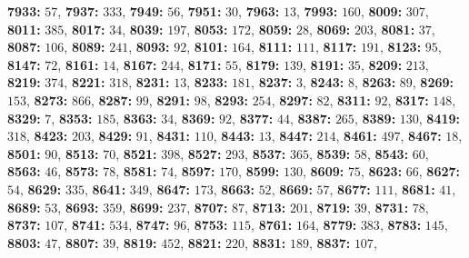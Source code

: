 \textsf{\bfseries 7933:} $57$, \textsf{\bfseries 7937:} $333$, \textsf{\bfseries 7949:} $56$, \textsf{\bfseries 7951:} $30$, \textsf{\bfseries 7963:} $13$, \textsf{\bfseries 7993:} $160$, \textsf{\bfseries 8009:} $307$, \textsf{\bfseries 8011:} $385$, \textsf{\bfseries 8017:} $34$, \textsf{\bfseries 8039:} $197$, \textsf{\bfseries 8053:} $172$, \textsf{\bfseries 8059:} $28$, \textsf{\bfseries 8069:} $203$, \textsf{\bfseries 8081:} $37$, \textsf{\bfseries 8087:} $106$, \textsf{\bfseries 8089:} $241$, \textsf{\bfseries 8093:} $92$, \textsf{\bfseries 8101:} $164$, \textsf{\bfseries 8111:} $111$, \textsf{\bfseries 8117:} $191$, \textsf{\bfseries 8123:} $95$, \textsf{\bfseries 8147:} $72$, \textsf{\bfseries 8161:} $14$, \textsf{\bfseries 8167:} $244$, \textsf{\bfseries 8171:} $55$, \textsf{\bfseries 8179:} $139$, \textsf{\bfseries 8191:} $35$, \textsf{\bfseries 8209:} $213$, \textsf{\bfseries 8219:} $374$, \textsf{\bfseries 8221:} $318$, \textsf{\bfseries 8231:} $13$, \textsf{\bfseries 8233:} $181$, \textsf{\bfseries 8237:} $3$, \textsf{\bfseries 8243:} $8$, \textsf{\bfseries 8263:} $89$, \textsf{\bfseries 8269:} $153$, \textsf{\bfseries 8273:} $866$, \textsf{\bfseries 8287:} $99$, \textsf{\bfseries 8291:} $98$, \textsf{\bfseries 8293:} $254$, \textsf{\bfseries 8297:} $82$, \textsf{\bfseries 8311:} $92$, \textsf{\bfseries 8317:} $148$, \textsf{\bfseries 8329:} $7$, \textsf{\bfseries 8353:} $185$, \textsf{\bfseries 8363:} $34$, \textsf{\bfseries 8369:} $92$, \textsf{\bfseries 8377:} $44$, \textsf{\bfseries 8387:} $265$, \textsf{\bfseries 8389:} $130$, \textsf{\bfseries 8419:} $318$, \textsf{\bfseries 8423:} $203$, \textsf{\bfseries 8429:} $91$, \textsf{\bfseries 8431:} $110$, \textsf{\bfseries 8443:} $13$, \textsf{\bfseries 8447:} $214$, \textsf{\bfseries 8461:} $497$, \textsf{\bfseries 8467:} $18$, \textsf{\bfseries 8501:} $90$, \textsf{\bfseries 8513:} $70$, \textsf{\bfseries 8521:} $398$, \textsf{\bfseries 8527:} $293$, \textsf{\bfseries 8537:} $365$, \textsf{\bfseries 8539:} $58$, \textsf{\bfseries 8543:} $60$, \textsf{\bfseries 8563:} $46$, \textsf{\bfseries 8573:} $78$, \textsf{\bfseries 8581:} $74$, \textsf{\bfseries 8597:} $170$, \textsf{\bfseries 8599:} $130$, \textsf{\bfseries 8609:} $75$, \textsf{\bfseries 8623:} $66$, \textsf{\bfseries 8627:} $54$, \textsf{\bfseries 8629:} $335$, \textsf{\bfseries 8641:} $349$, \textsf{\bfseries 8647:} $173$, \textsf{\bfseries 8663:} $52$, \textsf{\bfseries 8669:} $57$, \textsf{\bfseries 8677:} $111$, \textsf{\bfseries 8681:} $41$, \textsf{\bfseries 8689:} $53$, \textsf{\bfseries 8693:} $359$, \textsf{\bfseries 8699:} $237$, \textsf{\bfseries 8707:} $87$, \textsf{\bfseries 8713:} $201$, \textsf{\bfseries 8719:} $39$, \textsf{\bfseries 8731:} $78$, \textsf{\bfseries 8737:} $107$, \textsf{\bfseries 8741:} $534$, \textsf{\bfseries 8747:} $96$, \textsf{\bfseries 8753:} $115$, \textsf{\bfseries 8761:} $164$, \textsf{\bfseries 8779:} $383$, \textsf{\bfseries 8783:} $145$, \textsf{\bfseries 8803:} $47$, \textsf{\bfseries 8807:} $39$, \textsf{\bfseries 8819:} $452$, \textsf{\bfseries 8821:} $220$, \textsf{\bfseries 8831:} $189$, \textsf{\bfseries 8837:} $107$, 
